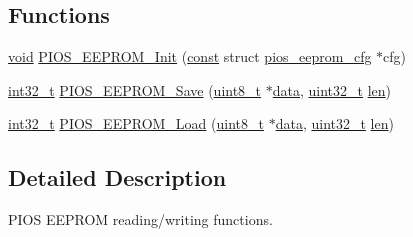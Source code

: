 \subsection*{Functions}
\begin{DoxyCompactItemize}
\item 
\hyperlink{group___n_a_m_e_ga18028b8badbf1ea7e704ccac3c488e82}{void} \hyperlink{group___p_i_o_s___e_e_p_r_o_m_ga89a716e16ce15d30ee420d5d0a2a3cd8}{P\-I\-O\-S\-\_\-\-E\-E\-P\-R\-O\-M\-\_\-\-Init} (\hyperlink{group___n_a_m_e_ga7ae6d0e43244213b34de2c2b9aa30da6}{const} struct \hyperlink{structpios__eeprom__cfg}{pios\-\_\-eeprom\-\_\-cfg} $\ast$cfg)
\item 
\hyperlink{group___n_a_m_e_gafd12020da5a235dfcf0c3c748fb5baed}{int32\-\_\-t} \hyperlink{group___p_i_o_s___e_e_p_r_o_m_ga324767758d92c2fa9701b4ae023362b2}{P\-I\-O\-S\-\_\-\-E\-E\-P\-R\-O\-M\-\_\-\-Save} (\hyperlink{stdint_8h_aba7bc1797add20fe3efdf37ced1182c5}{uint8\-\_\-t} $\ast$\hyperlink{pios__opahrs__proto_8h_a20e3f4bfaeccf09a75ef27e095a10112}{data}, \hyperlink{stdint_8h_a435d1572bf3f880d55459d9805097f62}{uint32\-\_\-t} \hyperlink{mavlink__helpers_8h_aba59486c1504340293255a065b546e3a}{len})
\item 
\hyperlink{group___n_a_m_e_gafd12020da5a235dfcf0c3c748fb5baed}{int32\-\_\-t} \hyperlink{group___p_i_o_s___e_e_p_r_o_m_ga2158356e9d0a6a63ba08dfc59492fce8}{P\-I\-O\-S\-\_\-\-E\-E\-P\-R\-O\-M\-\_\-\-Load} (\hyperlink{stdint_8h_aba7bc1797add20fe3efdf37ced1182c5}{uint8\-\_\-t} $\ast$\hyperlink{pios__opahrs__proto_8h_a20e3f4bfaeccf09a75ef27e095a10112}{data}, \hyperlink{stdint_8h_a435d1572bf3f880d55459d9805097f62}{uint32\-\_\-t} \hyperlink{mavlink__helpers_8h_aba59486c1504340293255a065b546e3a}{len})
\end{DoxyCompactItemize}


\subsection{Detailed Description}
P\-I\-O\-S E\-E\-P\-R\-O\-M reading/writing functions. 

